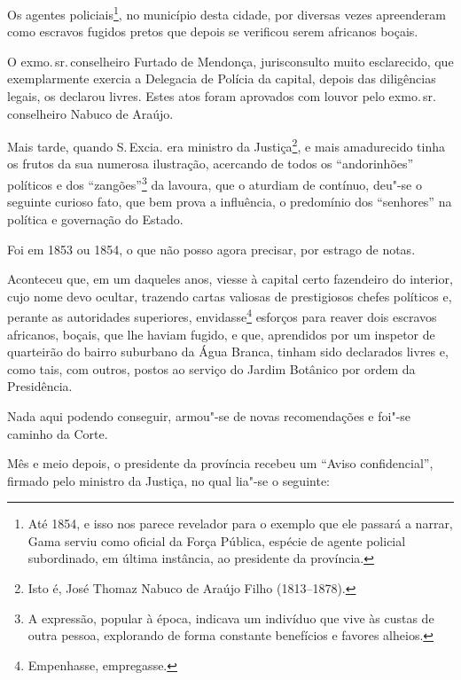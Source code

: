 Os agentes policiais\footnote{Até 1854, e isso nos parece revelador
  para o exemplo que ele passará a narrar, Gama serviu como oficial da
  Força Pública, espécie de agente policial subordinado, em última
  instância, ao presidente da província.}, no município desta cidade,
por diversas vezes apreenderam como escravos fugidos pretos que depois
se verificou serem africanos boçais.

O exmo.\,sr.\,conselheiro Furtado de Mendonça, jurisconsulto muito
esclarecido, que exemplarmente exercia a Delegacia de Polícia da
capital, depois das diligências legais, os declarou livres. Estes atos
foram aprovados com louvor pelo exmo.\,sr.\,conselheiro Nabuco de Araújo.

Mais tarde, quando S.\,Excia. era ministro da Justiça\footnote{Isto é,
  José Thomaz Nabuco de Araújo Filho (1813--1878).}, e mais amadurecido
tinha os frutos da sua numerosa ilustração, acercando de todos os
``andorinhões'' políticos e dos ``zangões''\footnote{A expressão, popular
  à época, indicava um indivíduo que vive às custas de outra pessoa,
  explorando de forma constante benefícios e favores alheios.} da
lavoura, que o aturdiam de contínuo, deu"-se o seguinte curioso fato, que
bem prova a influência, o predomínio dos ``senhores'' na política e
governação do Estado.

Foi em 1853 ou 1854, o que não posso agora precisar, por estrago de
notas.

Aconteceu que, em um daqueles anos, viesse à capital certo fazendeiro do
interior, cujo nome devo ocultar, trazendo cartas valiosas de
prestigiosos chefes políticos e, perante as autoridades superiores,
envidasse\footnote{Empenhasse, empregasse.} esforços para reaver dois
escravos africanos, boçais, que lhe haviam fugido, e que, aprendidos por
um inspetor de quarteirão do bairro suburbano da Água Branca, tinham
sido declarados livres e, como tais, com outros, postos ao serviço do
Jardim Botânico por ordem da Presidência.

Nada aqui podendo conseguir, armou"-se de novas recomendações e foi"-se
caminho da Corte.

Mês e meio depois, o presidente da província recebeu um ``Aviso
confidencial'', firmado pelo ministro da Justiça, no qual lia"-se o
seguinte:

